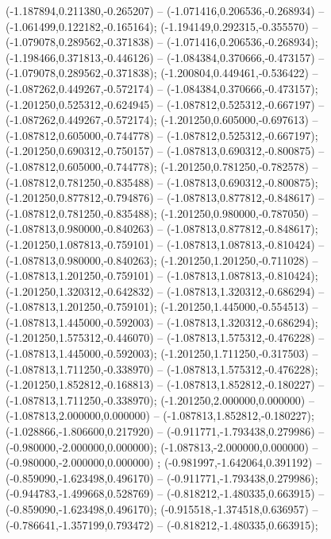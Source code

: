  (-1.187894,0.211380,-0.265207) -- (-1.071416,0.206536,-0.268934) -- (-1.061499,0.122182,-0.165164);
 (-1.194149,0.292315,-0.355570) -- (-1.079078,0.289562,-0.371838) -- (-1.071416,0.206536,-0.268934);
 (-1.198466,0.371813,-0.446126) -- (-1.084384,0.370666,-0.473157) -- (-1.079078,0.289562,-0.371838);
 (-1.200804,0.449461,-0.536422) -- (-1.087262,0.449267,-0.572174) -- (-1.084384,0.370666,-0.473157);
 (-1.201250,0.525312,-0.624945) -- (-1.087812,0.525312,-0.667197) -- (-1.087262,0.449267,-0.572174);
 (-1.201250,0.605000,-0.697613) -- (-1.087812,0.605000,-0.744778) -- (-1.087812,0.525312,-0.667197);
 (-1.201250,0.690312,-0.750157) -- (-1.087813,0.690312,-0.800875) -- (-1.087812,0.605000,-0.744778);
 (-1.201250,0.781250,-0.782578) -- (-1.087812,0.781250,-0.835488) -- (-1.087813,0.690312,-0.800875);
 (-1.201250,0.877812,-0.794876) -- (-1.087813,0.877812,-0.848617) -- (-1.087812,0.781250,-0.835488);
 (-1.201250,0.980000,-0.787050) -- (-1.087813,0.980000,-0.840263) -- (-1.087813,0.877812,-0.848617);
 (-1.201250,1.087813,-0.759101) -- (-1.087813,1.087813,-0.810424) -- (-1.087813,0.980000,-0.840263);
 (-1.201250,1.201250,-0.711028) -- (-1.087813,1.201250,-0.759101) -- (-1.087813,1.087813,-0.810424);
 (-1.201250,1.320312,-0.642832) -- (-1.087813,1.320312,-0.686294) -- (-1.087813,1.201250,-0.759101);
 (-1.201250,1.445000,-0.554513) -- (-1.087813,1.445000,-0.592003) -- (-1.087813,1.320312,-0.686294);
 (-1.201250,1.575312,-0.446070) -- (-1.087813,1.575312,-0.476228) -- (-1.087813,1.445000,-0.592003);
 (-1.201250,1.711250,-0.317503) -- (-1.087813,1.711250,-0.338970) -- (-1.087813,1.575312,-0.476228);
 (-1.201250,1.852812,-0.168813) -- (-1.087813,1.852812,-0.180227) -- (-1.087813,1.711250,-0.338970);
 (-1.201250,2.000000,0.000000) -- (-1.087813,2.000000,0.000000) -- (-1.087813,1.852812,-0.180227);
 (-1.028866,-1.806600,0.217920) -- (-0.911771,-1.793438,0.279986) -- (-0.980000,-2.000000,0.000000);
 (-1.087813,-2.000000,0.000000) -- (-0.980000,-2.000000,0.000000) ;
 (-0.981997,-1.642064,0.391192) -- (-0.859090,-1.623498,0.496170) -- (-0.911771,-1.793438,0.279986);
 (-0.944783,-1.499668,0.528769) -- (-0.818212,-1.480335,0.663915) -- (-0.859090,-1.623498,0.496170);
 (-0.915518,-1.374518,0.636957) -- (-0.786641,-1.357199,0.793472) -- (-0.818212,-1.480335,0.663915);
